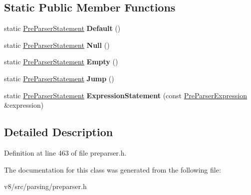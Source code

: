\subsection*{Static Public Member Functions}
\begin{DoxyCompactItemize}
\item 
\mbox{\label{classv8_1_1internal_1_1PreParserStatement_a932e6f366056841f205219195c215da3}} 
static \mbox{\hyperlink{classv8_1_1internal_1_1PreParserStatement}{Pre\+Parser\+Statement}} {\bfseries Default} ()
\item 
\mbox{\label{classv8_1_1internal_1_1PreParserStatement_a81582da92f174fb53081d0eef95295dd}} 
static \mbox{\hyperlink{classv8_1_1internal_1_1PreParserStatement}{Pre\+Parser\+Statement}} {\bfseries Null} ()
\item 
\mbox{\label{classv8_1_1internal_1_1PreParserStatement_aa4eaf5d997b93b7365856e59d00ab666}} 
static \mbox{\hyperlink{classv8_1_1internal_1_1PreParserStatement}{Pre\+Parser\+Statement}} {\bfseries Empty} ()
\item 
\mbox{\label{classv8_1_1internal_1_1PreParserStatement_aaa6ea3a564b5d61801de03d78059e0b4}} 
static \mbox{\hyperlink{classv8_1_1internal_1_1PreParserStatement}{Pre\+Parser\+Statement}} {\bfseries Jump} ()
\item 
\mbox{\label{classv8_1_1internal_1_1PreParserStatement_ad9e1f8acb632bc698f575884ee2d6339}} 
static \mbox{\hyperlink{classv8_1_1internal_1_1PreParserStatement}{Pre\+Parser\+Statement}} {\bfseries Expression\+Statement} (const \mbox{\hyperlink{classv8_1_1internal_1_1PreParserExpression}{Pre\+Parser\+Expression}} \&expression)
\end{DoxyCompactItemize}


\subsection{Detailed Description}


Definition at line 463 of file preparser.\+h.



The documentation for this class was generated from the following file\+:\begin{DoxyCompactItemize}
\item 
v8/src/parsing/preparser.\+h\end{DoxyCompactItemize}
